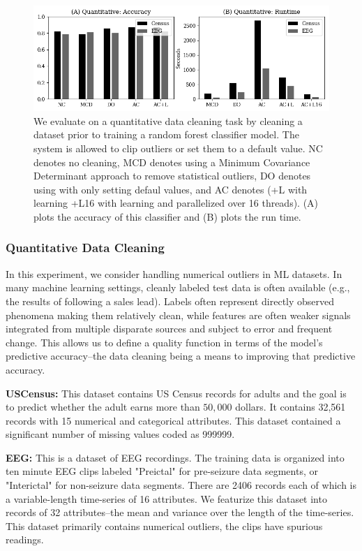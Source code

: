 \begin{figure}
    \centering
    \includegraphics[width=\columnwidth]{exp/exp2.png}
    \caption{We evaluate \sys on a quantitative data cleaning task by cleaning a dataset prior to training a random forest classifier model. The system is allowed to clip outliers or set them to a default value. NC denotes no cleaning, MCD denotes using a Minimum Covariance Determinant approach to remove statistical outliers, DO denotes using \sys with only setting defaul values, and AC denotes \sys (+L with learning +L16 with learning and parallelized over 16 threads). (A) plots the accuracy of this classifier and (B) plots the run time. \label{exp2a}}
\end{figure}

\subsubsection{Quantitative Data Cleaning}
In this experiment, we consider handling numerical outliers in ML datasets.
In many machine learning settings, cleanly labeled test data is often available (e.g., the results of following a sales lead). 
Labels often represent directly observed phenomena making them relatively clean, while features are often weaker signals integrated from multiple disparate sources and subject to error and frequent change.
This allows us to define a quality function in terms of the model's predictive accuracy--the data cleaning being a means to improving that predictive accuracy.

\vspace{0.5em}\noindent\textbf{USCensus: } This dataset contains US Census records for adults and the goal is to predict  whether the adult earns more than $50,000$ dollars. It contains 32,561 records with 15 numerical and categorical attributes. This dataset contained a significant number of missing values coded as 999999.

\vspace{0.5em}\noindent\textbf{EEG: } This is a dataset of EEG recordings. 
The training data is organized into ten minute EEG clips labeled "Preictal" for pre-seizure data segments, or "Interictal" for non-seizure data segments. 
There are 2406 records each of which is a variable-length time-series of 16 attributes. We featurize this dataset into records of 32 attributes--the mean and variance over the length of the time-series. 
This dataset primarily contains numerical outliers, the clips have spurious readings.

